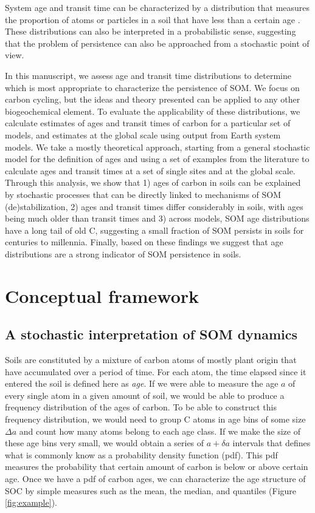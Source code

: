 \documentclass[draft,linenumbers]{agujournal}
\begin{document}
System age and transit time can be characterized by a distribution that measures the proportion of atoms or particles in a soil that have less than a certain age \citep{Eriksson1971, Bolin1973}. These distributions can also be interpreted in a probabilistic sense, suggesting that the problem of persistence can also be approached from a stochastic point of view. 

In this manuscript, we assess age and transit time distributions to determine which is most appropriate to characterize the persistence of SOM. We focus on carbon cycling, but the ideas and theory presented can be applied to any other biogeochemical element. To evaluate the applicability of these distributions, we calculate estimates of ages and transit times of carbon for a particular set of models, and estimates at the global scale using output from Earth system models. We take a mostly theoretical approach, starting from a general stochastic model for the definition of ages and using a set of examples from the literature to calculate ages and transit times at a set of single sites and at the global scale. Through this analysis, we show that 1) ages of carbon in soils can be explained by stochastic processes that can be directly linked to mechanisms of SOM (de)stabilization, 2) ages and transit times differ considerably in soils, with ages being much older than transit times and 3) across models, SOM age distributions have a long tail of old C, suggesting a small fraction of SOM persists in soils for centuries to millennia. Finally, based on these findings we suggest that age distributions are a strong indicator of SOM persistence in soils. 

\section{Conceptual framework}

\subsection{A stochastic interpretation of SOM dynamics}
Soils are constituted by a mixture of carbon atoms of mostly plant origin that have accumulated over a period of time. 
For each atom, the time elapsed since it entered the soil is defined here as \emph{age}. If we were able to measure the age $a$ of every single atom in a given amount of soil, we would be able to produce a frequency distribution of the ages of carbon. To be able to construct this frequency distribution, we would need to group C atoms in age bins of some size $\Delta a$ and count how many atoms belong to each age class.  If we make the size of these age bins very small, we would obtain a series of $a + \delta a$ intervals that defines what is commonly know as a probability density function (pdf). This pdf measures the probability that certain amount of carbon is below or above certain age. Once we have a pdf of carbon ages, we can characterize the age structure of SOC by simple measures such as the mean, the median, and quantiles (Figure \ref{fig:example}). 
\end{document}
